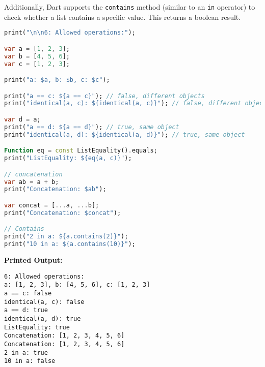 \documentclass{article}
\begin{document}
\begin{itemize}
Additionally, Dart supports the \texttt{contains} method (similar to an \texttt{in} operator) to check whether a list contains a specific value. This returns a boolean result.

\begin{lstlisting}[language=Dart]
print("\n\n6: Allowed operations:");

var a = [1, 2, 3];
var b = [4, 5, 6];
var c = [1, 2, 3];

print("a: $a, b: $b, c: $c");

print("a == c: ${a == c}"); // false, different objects
print("identical(a, c): ${identical(a, c)}"); // false, different objects

var d = a; 
print("a == d: ${a == d}"); // true, same object
print("identical(a, d): ${identical(a, d)}"); // true, same object

Function eq = const ListEquality().equals;
print("ListEquality: ${eq(a, c)}"); 

// concatenation
var ab = a + b;
print("Concatenation: $ab");

var concat = [...a, ...b];
print("Concatenation: $concat"); 

// Contains
print("2 in a: ${a.contains(2)}");
print("10 in a: ${a.contains(10)}");
\end{lstlisting}
\textbf{Printed Output:}
\begin{verbatim}
6: Allowed operations:
a: [1, 2, 3], b: [4, 5, 6], c: [1, 2, 3]
a == c: false
identical(a, c): false
a == d: true
identical(a, d): true
ListEquality: true
Concatenation: [1, 2, 3, 4, 5, 6]
Concatenation: [1, 2, 3, 4, 5, 6]
2 in a: true
10 in a: false
\end{verbatim}   
\end{itemize}
\newpage
\end{document}
